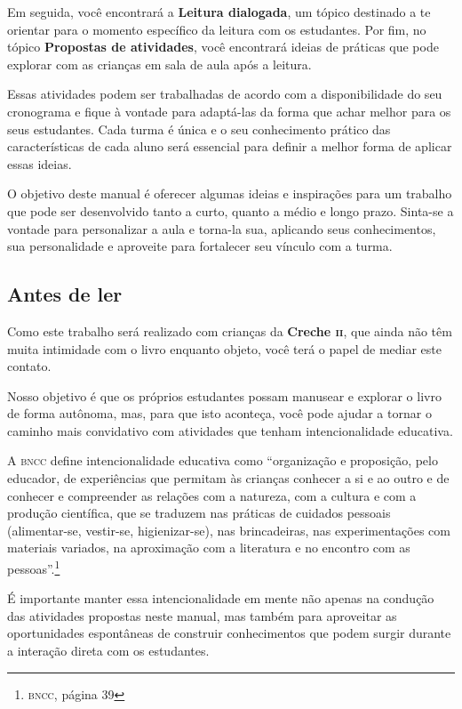 \documentclass[11pt]{extarticle}
\begin{document}
Em seguida, você encontrará a \textbf{Leitura dialogada}, um 
tópico destinado a te orientar para o momento específico da 
leitura com os estudantes. Por fim, no tópico 
\textbf{Propostas de atividades}, você encontrará ideias 
de práticas que pode explorar com as crianças em sala de 
aula após a leitura. 

Essas atividades podem ser trabalhadas de acordo com a 
disponibilidade do seu cronograma e fique à vontade para adaptá-las 
da forma que achar melhor para os seus estudantes. Cada turma é única 
e o seu conhecimento prático das características de cada aluno será 
essencial para definir a melhor forma de aplicar essas ideias. 

O objetivo deste manual é oferecer algumas ideias 
e inspirações para um trabalho que pode ser desenvolvido tanto 
a curto, quanto a médio e longo prazo. Sinta-se a vontade para 
personalizar a aula e torna-la sua, aplicando seus conhecimentos, sua 
personalidade e aproveite para fortalecer 
seu vínculo com a turma.


\subsection{Antes de ler}



Como este trabalho será realizado com crianças da \textbf{Creche \textsc{ii}}, 
que ainda não têm muita intimidade com o livro enquanto objeto, você terá o 
papel de mediar este contato. 

Nosso objetivo é que os próprios estudantes possam manusear 
e explorar o livro de forma autônoma, mas, para que isto aconteça, você 
pode ajudar a tornar o caminho mais convidativo com atividades que tenham 
intencionalidade educativa. 

A \textsc{bncc} define intencionalidade educativa como ``organização 
e proposição, pelo educador, de experiências que permitam às crianças 
conhecer a si e ao outro e de conhecer e compreender as relações com a 
natureza, com a cultura e com a produção científica, que se traduzem nas 
práticas de cuidados pessoais (alimentar-se, vestir-se, higienizar-se), 
nas brincadeiras, nas experimentações com materiais 
variados, na aproximação com a literatura e no encontro com as 
pessoas''.\footnote{\textsc{bncc}, página 39}

É importante manter essa intencionalidade em mente não apenas na condução 
das atividades propostas neste manual, mas também para aproveitar as 
oportunidades espontâneas de construir conhecimentos que podem surgir durante 
a interação direta com os estudantes.
\end{document}
